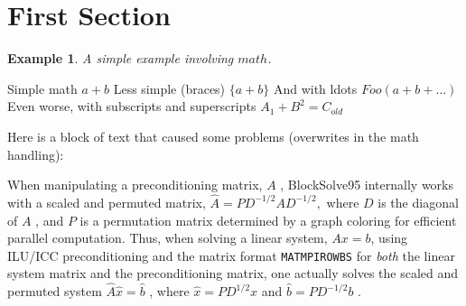 

\newtheorem{example}{Example}[section]

\section{First Section}

\begin{example}
  A simple example involving \(math\).
\end{example}

Simple math
\( a + b \)
Less simple (braces)
\( \{ a + b \}\)
And with ldots
\( Foo( a + b + \ldots ) \)
Even worse, with subscripts and superscripts 
\( A_1 + B^2 = C_{old} \)

Here is a block of text that caused some problems (overwrites in the
math handling):

When manipulating a preconditioning matrix, \( A \) , BlockSolve95
internally works with a scaled and permuted matrix, \( \hat{A} = P
D^{-1/2} A D^{-1/2},\) where \( D \) is the diagonal of \( A \) , and \( P \) is a
permutation matrix determined by a graph coloring for efficient
parallel computation.  Thus, when solving a linear system, \( Ax=b \),
using ILU/ICC preconditioning and the matrix format {\tt MATMPIROWBS}
for {\em both} the linear system matrix and the preconditioning
matrix, one actually solves the scaled and permuted system \( \hat{A}
\hat{x} = \hat{b} \) , where \( \hat{x} = P D^{1/2} x \) and \(\hat{b} = P
D^{-1/2} b\) . 



